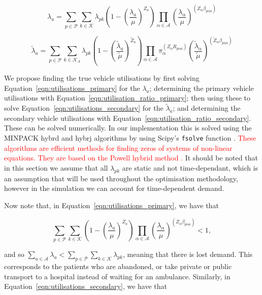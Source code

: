 \documentclass[numbers,webpdf,imaman]{ima-authoring-template}%
\begin{document}
\begin{equation}\label{eqn:utilisations_primary}
\lambda_a = \sum_{p \in \mathcal{P}} \sum_{k \in \mathcal{K}} \lambda_{pk}
\left( 1 - \left(\frac{\lambda_a}{\mu}\right)^{Z_a} \right)
\prod_{\alpha \in \mathcal{A}} \left(\frac{\lambda_{\alpha}}{\mu}\right)^{
\left(Z_{\alpha} \beta_{p \alpha a}\right)}
\end{equation}

\begin{equation}\label{eqn:utilisations_secondary}
\tilde{\lambda}_a = \sum_{p \in \mathcal{P}}
\sum_{k \in \mathcal{K}_A} \lambda_{pk}
\left( 1 - \left(\frac{\tilde{\lambda}_a}{\tilde{\mu}}\right)^{\tilde{Z}_a} \right)
\prod_{\alpha \in \mathcal{A}} \pi_{\alpha}^{\left(Z_{\alpha} R_{p \alpha a}\right)}
\left(\frac{\tilde{\lambda}_{\alpha}}{\tilde{\mu}}\right)^{
\left(\tilde{Z}_{\alpha} \beta_{p \alpha a}\right)}
\end{equation}


We propose finding the true vehicle utilisations by first solving
Equation~\ref{eqn:utilisations_primary} for the $\lambda_a$; determining the
primary vehicle utilisations with Equation~\ref{eqn:utilisation_ratio_primary};
then using these to solve Equation~\ref{eqn:utilisations_secondary} for the
$\tilde{\lambda}_a$; and determining the secondary vehicle utilisations with
Equation~\ref{eqn:utilisation_ratio_secondary}. These can be solved
numerically. In our implementation this is solved using the MINPACK hybrd and
hybrj algorithms by using Scipy's \texttt{fsolve} function
\citep{2020SciPy-NMeth}. \textcolor{red}{These algorithms are efficient methods for finding zeros of systems of non-linear equations. They are based on the Powell hybrid method \citep{powell70}.} It should be noted that in this section we assume that
all $\lambda_{pk}$ are static and not time-dependant, which is an assumption
that will be used throughout the optimisation methodology, however in the
simulation we can account for time-dependent demand.

Now note that, in Equation~\ref{eqn:utilisations_primary}, we have that

$$\sum_{p \in \mathcal{P}} \sum_{k \in \mathcal{K}} \left( 1 - \left(\frac{\lambda_a}{\mu}\right)^{Z_a} \right) \prod_{\alpha \in \mathcal{A}} \left(\frac{\lambda_{\alpha}}{\mu}\right)^{\left(Z_{\alpha} \beta_{p \alpha a}\right)} < 1,$$

\noindent
and so
$\sum_{a \in \mathcal{A}} \lambda_a < \sum_{p \in \mathcal{P}} \sum_{k \in \mathcal{K}} \lambda_{pk}$,
meaning that there is lost demand. This corresponds to the patients who are
abandoned, or take private or public transport to a hospital instead of waiting
for an ambulance. Similarly, in Equation~\ref{eqn:utilisations_secondary}, we
have that
\end{document}
